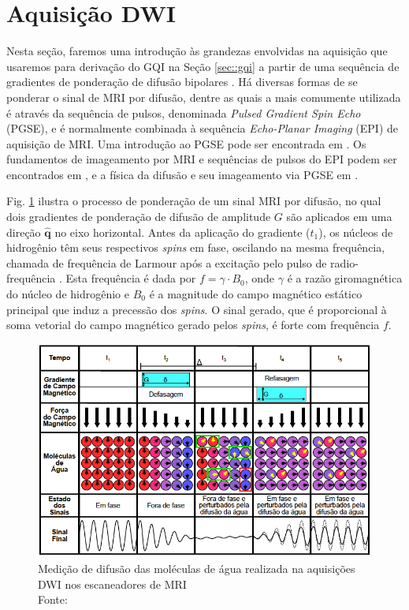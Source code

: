 \documentclass[
    12pt,                %
    oneside,            %
    a4paper,            %
    english,            %
    french,                %
    spanish,            %
    brazil                %
    ]{abntex2}
\begin{document}
\section{Aquisição DWI}
\label{sec::aquisicao_dwi}
Nesta seção, faremos uma introdução às grandezas envolvidas na aquisição que usaremos para derivação do GQI na Seção \ref{sec::gqi} a partir de uma sequência de gradientes de ponderação de difusão bipolares \cite{mori2013}. Há diversas formas de se ponderar o sinal de MRI por difusão, dentre as quais a mais comumente utilizada é através da sequência de pulsos, denominada \textit{Pulsed Gradient Spin Echo} (PGSE), e é normalmente combinada à sequência \textit{Echo-Planar Imaging} (EPI) de aquisição de MRI. Uma introdução ao PGSE pode ser encontrada em . Os fundamentos de imageamento por MRI e sequências de pulsos do EPI podem ser encontrados em , e a física da difusão e seu imageamento via PGSE em .

Fig. \ref{fig::pgse_ilustrado} ilustra o processo de ponderação de um sinal MRI por difusão, no qual dois gradientes de ponderação de difusão de amplitude $G$ são aplicados em uma direção $\mathbf{\hat{q}}$ no eixo horizontal. Antes da aplicação do gradiente ($t_1$), os núcleos de hidrogênio têm seus respectivos \textit{spins} em fase, oscilando na mesma frequência, chamada de frequência de Larmour  após a excitação pelo pulso de radio-frequência \cite{mori2013}. Esta frequência é dada por  $f = \gamma \cdot B_0$, onde $\gamma$ é a razão giromagnética do núcleo de hidrogênio e $B_0$ é a magnitude do campo magnético estático principal que induz a precessão dos \textit{spins}. O sinal gerado, que é proporcional à soma vetorial do campo magnético gerado pelos \textit{spins}, é forte com frequência $f$.

\begin{figure}[ht]

    \centering
    \includegraphics[width=.8\linewidth, angle=0]{figs/HARDI/pgse2.png}
    \caption{Medição de difusão das moléculas de água realizada na aquisições DWI nos escaneadores de MRI \\
    Fonte: \cite{voltoline2016}
    }
    \label{fig::pgse_ilustrado}
   \hspace{1pt}
\end{figure}
\end{document}
